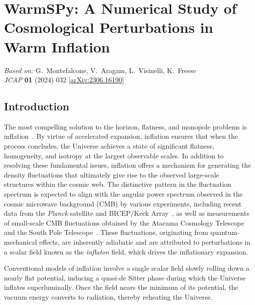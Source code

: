\chapter{WarmSPy: A Numerical Study of Cosmological Perturbations in Warm Inflation}
\label{ch:warmspy}

\begin{center}
\textit{Based on:} G.~Montefalcone, V.~Aragam, L.~Visinelli, K.~Freese\\
\textit{JCAP} \textbf{01} (2024) 032
[\href{https://arxiv.org/abs/2306.16190}{arXiv:2306.16190}]
\end{center}
\vspace{1em}

\newcommand{\primefortyfive}{\mathrel{\text{\rotatebox[origin=c]{30}{$'$}}}}
\newcommand{\dprimefortyfive}{\mathrel{\text{\rotatebox[origin=c]{30}{$\prime\prime$}}}}


\section{Introduction}
\label{sec:ch4-introduction}

The most compelling solution to the horizon, flatness, and monopole problems is inflation~\cite{Guth:1980zm, Linde:1981mu, Albrecht:1982wi, Kazanas:1980tx, Starobinsky:1980te, Sato:1980yn, Mukhanov:1981xt, Linde:1983gd, Mukhanov:1990me}. By virtue of accelerated expansion, inflation ensures that when the process concludes, the Universe achieves a state of significant flatness, homogeneity, and isotropy at the largest observable scales.
In addition to resolving these fundamental issues, inflation offers a mechanism for generating the density fluctuations that ultimately give rise to the observed large-scale structures within the cosmic web. The distinctive pattern in the fluctuation spectrum is expected to align with the angular power spectrum observed in the cosmic microwave background (CMB) by various experiments, including recent data from the {\it Planck} satellite and BICEP/Keck Array~\cite{Planck:2018nkj, Planck:2018jri}, as well as measurements of small-scale CMB fluctuations obtained by the Atacama Cosmology Telescope~\cite{ACT:2020gnv, ACT:2020frw, ACT:2023dou} and the South Pole Telescope~\cite{SPT-3G:2021eoc, SPT-3G:2021wgf}. These fluctuations, originating from quantum-mechanical effects, are inherently adiabatic and are attributed to perturbations in a scalar field known as the {\it inflaton} field, which drives the inflationary expansion.

Conventional models of inflation involve a single scalar field slowly rolling down a nearly flat potential, inducing a quasi-de Sitter phase during which the Universe inflates superluminally.  Once the field nears the minimum of its potential, the vacuum energy converts to radiation, thereby reheating the Universe. 


